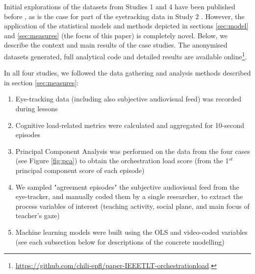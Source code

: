 \documentclass[10pt,journal,compsoc]{IEEEtran}
\begin{document}
Initial explorations of the datasets from Studies 1 and 4 have been published before \cite{Prieto2015cscl}, as is the case for part of the eyetracking data in Study 2 \cite{Prieto2015ectel}. However, the application of the statistical models and methods depicted in sections \ref{sec:model} and \ref{sec:measures} (the focus of this paper) is completely novel. Below, we describe the context and main results of the case studies. The anonymised datasets generated, full analytical code and detailed results are available online\footnote{\href{https://github.com/chili-epfl/paper-IEEETLT-orchestrationload}{https://github.com/chili-epfl/paper-IEEETLT-orchestrationload}.}.

In all four studies, we followed the data gathering and analysis methods described in section \ref{sec:measures}:

\begin{enumerate}
\item Eye-tracking data (including also subjective audiovisual feed) was recorded during lessons
\item Cognitive load-related metrics were calculated and aggregated for 10-second episodes
\item Principal Component Analysis was performed on the data from the four cases (see Figure \ref{fig:pca}) to obtain the orchestration load score (from the 1$^{st}$ principal component score of each episode)
\item We sampled "agreement episodes" the subjective audiovisual feed from the eye-tracker, and manually coded them by a single researcher, to extract the process variables of interest (teaching activity, social plane, and main focus of teacher's gaze)
\item Machine learning models were built using the OLS and video-coded variables (see each subsection below for descriptions of the concrete modelling)
\end{enumerate}
\end{document}
